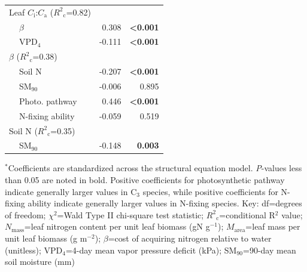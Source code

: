 \begin{table}
\begin{tabular}{p{0.5cm}p{3cm}p{1.5cm}p{1.5cm}}
            \multicolumn{2}{l}{Leaf $C_\mathrm{i}$:$C_\mathrm{a}$ ($R^2{}_\mathrm{c}$=0.82)} && \\
            & \multicolumn{1}{l}{$\beta$}                               & \multicolumn{1}{r}{0.308}     & \multicolumn{1}{r}{\textbf{<0.001}} \\
            & \multicolumn{1}{l}{VPD$_4$}                               & \multicolumn{1}{r}{-0.111}    & \multicolumn{1}{r}{\textbf{<0.001}} \\
            \hline

            \multicolumn{2}{l}{$\beta$ ($R^2{}_\mathrm{c}$=0.38)} && \\
            & \multicolumn{1}{l}{Soil N}                                & \multicolumn{1}{r}{-0.207}    & \multicolumn{1}{r}{\textbf{<0.001}} \\
            & \multicolumn{1}{l}{SM$_{90}$}                             & \multicolumn{1}{r}{-0.006}    & \multicolumn{1}{r}{0.895} \\
            & \multicolumn{1}{l}{Photo. pathway}                        & \multicolumn{1}{r}{0.446}     & \multicolumn{1}{r}{\textbf{<0.001}} \\
            & \multicolumn{1}{l}{N-fixing ability}                      & \multicolumn{1}{r}{-0.059}    & \multicolumn{1}{r}{0.519} \\
            \hline

            \multicolumn{2}{l}{Soil N ($R^2{}_\mathrm{c}$=0.35)} && \\
            & \multicolumn{1}{l}{SM$_{90}$} & \multicolumn{1}{r}{-0.148} & \multicolumn{1}{r}{\textbf{0.003}} \\
            \hline

        \end{tabular}%
        \label{tab:table4.5}
    \end{table}
\begin{singlespace}
    \noindent $^*$Coefficients are standardized across the structural equation model. \textit{P}-values less than 0.05 are noted in bold. Positive coefficients for photosynthetic pathway indicate generally larger values in C$_3$ species, while positive coefficients for N-fixing ability indicate generally larger values in N-fixing species. Key: df=degrees of freedom; $\chi^2$=Wald Type II chi-square test statistic; $R^2{}_\mathrm{c}$=conditional R$^2$ value; $N_\mathrm{mass}$=leaf nitrogen content per unit leaf biomass (gN g$^{-1}$); $M_\mathrm{area}$=leaf mass per unit leaf biomass (g m$^{-2}$); $\beta$=cost of acquiring nitrogen relative to water (unitless); VPD$_4$=4-day mean vapor pressure deficit (kPa); SM$_{90}$=90-day mean soil moisture (mm)
\end{singlespace}
\clearpage

